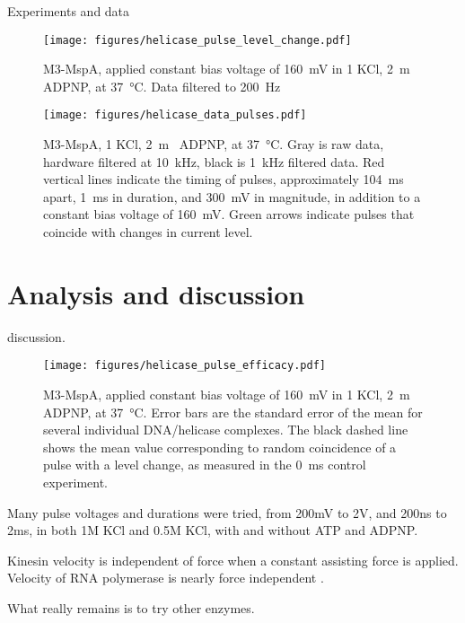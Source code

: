 Experiments and data

\begin{figure}[h]
\begin{centering}
\texttt{[image: figures/helicase\_pulse\_level\_change.pdf]}
\caption[Voltage pulse can induce a helicase step]{M3-MspA, applied constant bias voltage of \SI{160}{\mV} in \SI{1}{\Molar} KCl, \SI{2}{\m\Molar} ADPNP, at \SI{37}{\celsius}. Data filtered to \SI{200}{\Hz}}
\label{fig:helicase_pulse}
\end{centering}
\end{figure}

\begin{figure}[h]
\begin{centering}
\texttt{[image: figures/helicase\_data\_pulses.pdf]}
\caption[A fraction of pulses move the helicase]{M3-MspA, \SI{1}{\Molar} KCl, \SI{2}{\m\Molar} ADPNP, at \SI{37}{\celsius}.  Gray is raw data, hardware filtered at \SI{10}{\kHz}, black is \SI{1}{\kHz} filtered data.  Red vertical lines indicate the timing of pulses, approximately \SI{104}{\ms} apart, \SI{1}{\ms} in duration, and \SI{300}{\mV} in magnitude, in addition to a constant bias voltage of \SI{160}{\mV}.  Green arrows indicate pulses that coincide with changes in current level.}
\label{fig:helicase_pulse_traces}
\end{centering}
\end{figure}

\section{Analysis and discussion}

discussion.

\begin{figure}[h]
\begin{centering}
\texttt{[image: figures/helicase\_pulse\_efficacy.pdf]}
\caption[Quantifying efficacy of pulses]{M3-MspA, applied constant bias voltage of \SI{160}{\mV} in \SI{1}{\Molar} KCl, \SI{2}{\m\Molar} ADPNP, at \SI{37}{\celsius}.  Error bars are the standard error of the mean for several individual DNA/helicase complexes.  The black dashed line shows the mean value corresponding to random coincidence of a pulse with a level change, as measured in the \SI{0}{\ms} control experiment.}
\label{fig:helicase_pulse_efficacy}
\end{centering}
\end{figure}

Many pulse voltages and durations were tried, from 200mV to 2V, and 200ns to 2ms, in both 1M KCl and 0.5M KCl, with and without ATP and ADPNP.

Kinesin velocity is independent of force when a constant assisting force is applied.  Velocity of RNA polymerase is nearly force independent \citep{Bustamante2004}.

What really remains is to try other enzymes.
